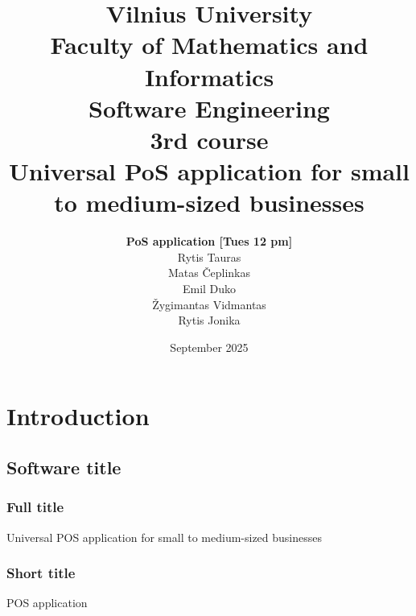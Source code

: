 \documentclass{article}
\title{Vilnius University\\Faculty of Mathematics and Informatics\\Software Engineering\\3rd course\\[1cm] \Huge Universal PoS application for small to medium-sized businesses\\[1cm]}
\author{\textbf{PoS application [Tues 12 pm]}\\[0.25cm]Rytis Tauras\\Matas Čeplinkas\\Emil Duko\\Žygimantas Vidmantas\\Rytis Jonika\\[4cm]}
\date{September 2025}
\begin{document}
\maketitle

\newpage
\setcounter{tocdepth}{3}
\tableofcontents
\newpage

\section{Introduction}
\subsection{Software title}
\subsubsection{Full title} Universal POS application for small to medium-sized businesses
\subsubsection{Short title} POS application
\end{document}
